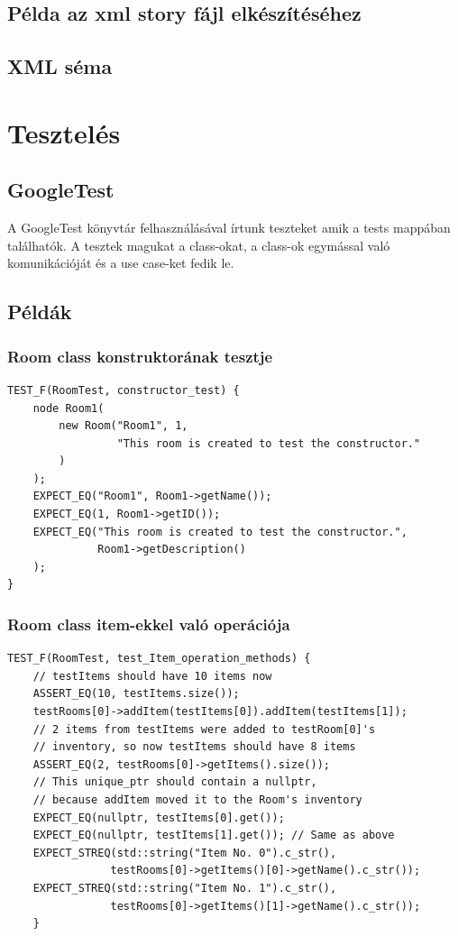 \documentclass{scrarticle}
\begin{document}
\subsection{Példa az xml story fájl elkészítéséhez}

\newpage
\subsection{XML séma}


\newpage
\section{Tesztelés}
\subsection{GoogleTest}
A GoogleTest könyvtár felhasználásával írtunk teszteket amik a tests mappában találhatók. A tesztek magukat a class-okat, a class-ok egymással való komunikációját és a use case-ket fedik le.
\subsection{Példák}
\subsubsection{Room class konstruktorának tesztje}
\begin{lstlisting}
TEST_F(RoomTest, constructor_test) {
    node Room1(
        new Room("Room1", 1, 
                 "This room is created to test the constructor."
        )
    );
    EXPECT_EQ("Room1", Room1->getName());
    EXPECT_EQ(1, Room1->getID());
    EXPECT_EQ("This room is created to test the constructor.", 
              Room1->getDescription()
    );
}
\end{lstlisting}
\subsubsection{Room class item-ekkel való operációja}
\begin{lstlisting}
TEST_F(RoomTest, test_Item_operation_methods) {
    // testItems should have 10 items now
    ASSERT_EQ(10, testItems.size());
    testRooms[0]->addItem(testItems[0]).addItem(testItems[1]);
    // 2 items from testItems were added to testRoom[0]'s 
    // inventory, so now testItems should have 8 items
    ASSERT_EQ(2, testRooms[0]->getItems().size());
    // This unique_ptr should contain a nullptr, 
    // because addItem moved it to the Room's inventory
    EXPECT_EQ(nullptr, testItems[0].get()); 
    EXPECT_EQ(nullptr, testItems[1].get()); // Same as above
    EXPECT_STREQ(std::string("Item No. 0").c_str(), 
                testRooms[0]->getItems()[0]->getName().c_str());
    EXPECT_STREQ(std::string("Item No. 1").c_str(), 
                testRooms[0]->getItems()[1]->getName().c_str());
    }
\end{lstlisting}
\end{document}

